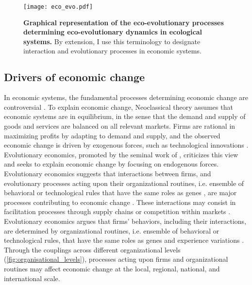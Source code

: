 \begin{figure}[ht]
    \centering
    \texttt{[image: eco\_evo.pdf]}
\caption{\textbf{Graphical representation of the eco-evolutionary processes determining eco-evolutionary dynamics in ecological systems.} By extension, I use this terminology to designate interaction and evolutionary processes in economic systems.}
\label{fig:eco_evo}
\end{figure}

\subsection{Drivers of economic change}
In economic systems, the fundamental processes determining economic change are controversial \citep{Dopfer2007,Nelson2014,Hodgson2019}. 
To explain economic change, Neoclassical theory \citep{10.1093/cje/bet027} assumes that economic systems are in equilibrium, in the sense that the demand and supply of goods and services are balanced on all relevant markets. 
Firms are rational in maximizing profits by adapting to demand and supply, and the observed economic change is driven by exogenous forces, such as technological innovations \citep{Romer1986}. Evolutionary economics, promoted by the seminal work of \cite{Nelson2014}, criticizes this view and seeks to explain economic change by focusing on endogenous forces. 
% 
Evolutionary economics suggests that interactions between firms, and evolutionary processes acting upon their organizational routines, i.e. ensemble of behavioral or technological rules that have the same roles as genes \citep{nelson1985evolutionary}, are major processes contributing to economic change \citep{Hodgson2019}.
% 
These interactions may consist in facilitation processes through supply chains \citep{Ozman2009,Saavedra2009a,VanDerPanne2004} or competition within markets \citep{Wernerfelt1989}. Evolutionary economics argues that firms' behaviors, including their interactions, are determined by organizational routines, i.e. ensemble of behavioral or technological rules, that have the same roles as genes and experience variations \citep{nelson1985evolutionary}. Through the couplings across different organizational levels (\cref{fig:organisational_levels}), processes acting upon firms and organizational routines may affect economic change at the local, regional, national, and international scale.


